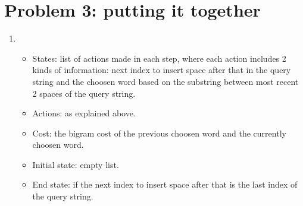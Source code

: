 \documentclass[12pt]{article}
\begin{document}
\section*{Problem 3: putting it together}
\begin{enumerate}[label=(\alph*)]
    \item \addtocounter{enumi}{1}
    \begin{itemize}
    \item States: list of actions made in each step, where each action includes 2 kinds of information: next index to insert space after that in the query string and the choosen word based on the substring between most recent 2 spaces of the query string. \\
    \item Actions: as explained above.\\
    \item Cost: the bigram cost of the previous choosen word and the currently choosen word. \\
    \item Initial state: empty list. \\
    \item End state: if the next index to insert space after that is the last index of the query string.
	\end{itemize}


\end{enumerate}
\end{document}
